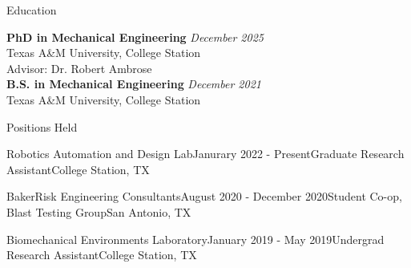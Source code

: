 \documentclass[
	11pt, %
]{resume} %
\begin{document}
\begin{rSection}{Education}

	\textbf{PhD in Mechanical Engineering} \hfill \textit{December 2025} \\          
    Texas A\&M University, College Station\\ 
	Advisor: Dr. Robert Ambrose \smallskip\\
	\textbf{B.S. in Mechanical Engineering} \hfill \textit{December 2021} \\ 
	 Texas A\&M University, College Station\\
	
\end{rSection}

\begin{rSection}{Positions Held}
    \begin{rSubsection}{Robotics Automation and Design Lab}{Janurary 2022 - Present}{Graduate Research Assistant}{College Station, TX}
    \end{rSubsection}
    \begin{rSubsection}{BakerRisk Engineering Consultants}{August 2020 - December 2020}{Student Co-op, Blast Testing Group}{San Antonio, TX}
    \end{rSubsection}
    \begin{rSubsection}{Biomechanical Environments Laboratory}{January 2019 - May 2019}{Undergrad Research Assistant}{College Station, TX}
    \end{rSubsection}
\end{rSection}
\end{document}
